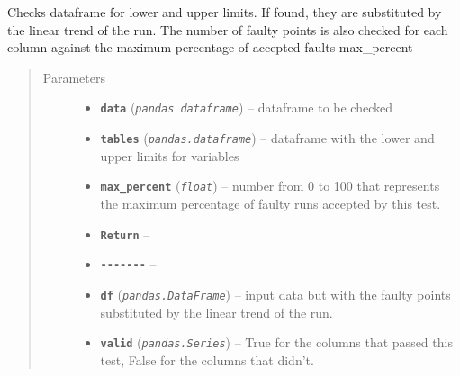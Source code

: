 \documentclass[a4paper,10pt,oneside]{sphinxmanual}
\begin{document}

\begin{fulllineitems}
\label{pymicra:pymicra.tests.check_limits}
Checks dataframe for lower and upper limits. If found, they are substituted by
the linear trend of the run. The number of faulty points is also checked for each
column against the maximum percentage of accepted faults max\_percent
\begin{quote}\begin{description}
\item[{Parameters}] \leavevmode\begin{itemize}
\item {} 
\textbf{\texttt{data}} (\emph{\texttt{pandas dataframe}}) -- dataframe to be checked

\item {} 
\textbf{\texttt{tables}} (\emph{\texttt{pandas.dataframe}}) -- dataframe with the lower and upper limits for variables

\item {} 
\textbf{\texttt{max\_percent}} (\emph{\texttt{float}}) -- number from 0 to 100 that represents the maximum percentage of faulty
runs accepted by this test.

\item {} 
\textbf{\texttt{Return}} -- 

\item {} 
\textbf{\texttt{-{-}-{-}-{-}-}} -- 

\item {} 
\textbf{\texttt{df}} (\emph{\texttt{pandas.DataFrame}}) -- input data but with the faulty points substituted by the linear trend of the run.

\item {} 
\textbf{\texttt{valid}} (\emph{\texttt{pandas.Series}}) -- True for the columns that passed this test, False for the columns that didn't.

\end{itemize}

\end{description}\end{quote}

\end{fulllineitems}

\end{document}
